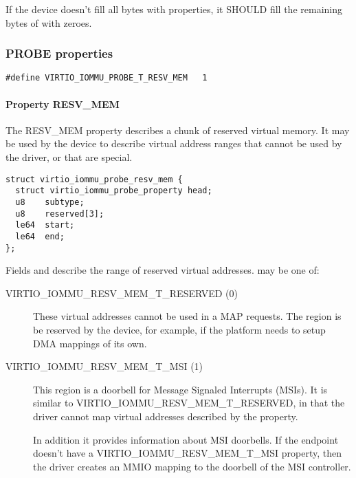 If the device doesn't fill all  bytes with properties,
it SHOULD fill the remaining bytes of  with zeroes.

\subsubsection{PROBE properties}\label{sec:Device Types / IOMMU Device / Device operations / PROBE properties}

\begin{lstlisting}
#define VIRTIO_IOMMU_PROBE_T_RESV_MEM   1
\end{lstlisting}

\paragraph{Property RESV_MEM}\label{sec:Device Types / IOMMU Device / Device operations / PROBE properties / RESVMEM}

The RESV_MEM property describes a chunk of reserved virtual memory. It may
be used by the device to describe virtual address ranges that cannot be
used by the driver, or that are special.

\begin{lstlisting}
struct virtio_iommu_probe_resv_mem {
  struct virtio_iommu_probe_property head;
  u8    subtype;
  u8    reserved[3];
  le64  start;
  le64  end;
};
\end{lstlisting}

Fields  and  describe the range of reserved virtual
addresses.  may be one of:

\begin{description}
  \item[VIRTIO_IOMMU_RESV_MEM_T_RESERVED (0)]
    These virtual addresses cannot be used in a MAP requests. The region
    is be reserved by the device, for example, if the platform needs to
    setup DMA mappings of its own.

  \item[VIRTIO_IOMMU_RESV_MEM_T_MSI (1)]
    This region is a doorbell for Message Signaled Interrupts (MSIs). It
    is similar to VIRTIO_IOMMU_RESV_MEM_T_RESERVED, in that the driver
    cannot map virtual addresses described by the property.

    In addition it provides information about MSI doorbells. If the
    endpoint doesn't have a VIRTIO_IOMMU_RESV_MEM_T_MSI property, then the
    driver creates an MMIO mapping to the doorbell of the MSI controller.
\end{description}

